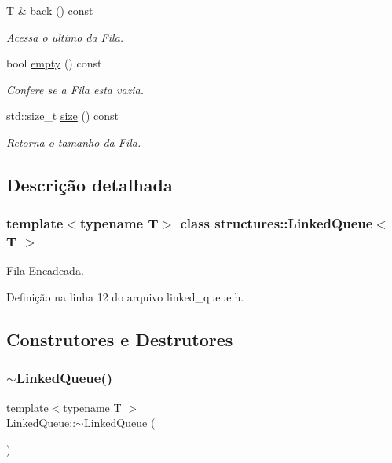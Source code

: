 \begin{DoxyCompactItemize}
T \& \mbox{\hyperlink{classstructures_1_1_linked_queue_a194d5842787ddffafecfb44bd14e8d9d}{back}} () const
\begin{DoxyCompactList}\small\item\em Acessa o ultimo da Fila. \end{DoxyCompactList}\item 
bool \mbox{\hyperlink{classstructures_1_1_linked_queue_af956750d6053c0fcb41914615a1a3bfe}{empty}} () const
\begin{DoxyCompactList}\small\item\em Confere se a Fila esta vazia. \end{DoxyCompactList}\item 
std\+::size\+\_\+t \mbox{\hyperlink{classstructures_1_1_linked_queue_a97af1a092fe5f7f15182bf93d1bc396d}{size}} () const
\begin{DoxyCompactList}\small\item\em Retorna o tamanho da Fila. \end{DoxyCompactList}\end{DoxyCompactItemize}


\subsection{Descrição detalhada}
\subsubsection*{template$<$typename T$>$\newline
class structures\+::\+Linked\+Queue$<$ T $>$}

Fila Encadeada. 

Definição na linha 12 do arquivo linked\+\_\+queue.\+h.



\subsection{Construtores e Destrutores}
\mbox{\label{classstructures_1_1_linked_queue_ab08efd98f87a1dcd7a2c40588778cb80}} 
\subsubsection{\texorpdfstring{$\sim$LinkedQueue()}{~LinkedQueue()}}
{\footnotesize\ttfamily template$<$typename T $>$ \\
Linked\+Queue\+::$\sim$\+Linked\+Queue (\begin{DoxyParamCaption}{ }\end{DoxyParamCaption})}



